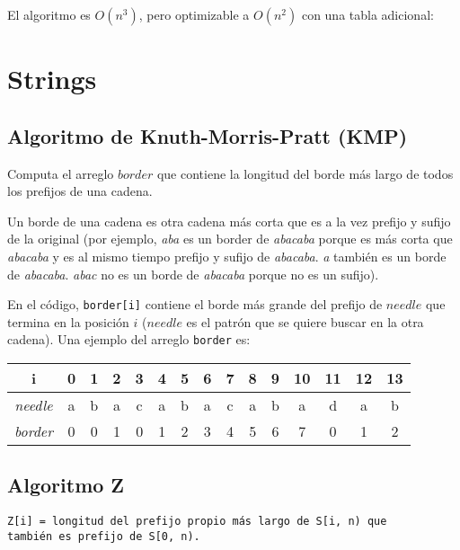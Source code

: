 \documentclass[10pt,letterpaper,twocolumn]{article}
\newcommand{\codigofuente}[1]{

\dotfill
}
\begin{document}
\medskip
El algoritmo es $O(n^3)$, pero optimizable a $O(n^2)$ con una tabla adicional:
\codigofuente{./src/dp/particion_troncos.cpp}

\section{Strings}
\subsection{Algoritmo de Knuth-Morris-Pratt (KMP)}

Computa el arreglo $border$ que contiene la longitud del borde más largo de todos
los prefijos de una cadena.

Un borde de una cadena es otra cadena más corta que es a la vez prefijo y sufijo de la original
(por ejemplo, \textit{aba} es un border de \textit{abacaba} porque es más corta que \textit{abacaba}
y es al mismo tiempo prefijo y sufijo de \textit{abacaba}. \textit{a} también es un borde de \textit{abacaba}.
\textit{abac} no es un borde de \textit{abacaba} porque no es un sufijo).

\smallskip

En el código, \verb_border[i]_ contiene el borde más grande del prefijo de $needle$ que termina en la posición $i$ ($needle$
es el patrón que se quiere buscar en la otra cadena). Una ejemplo del arreglo \verb_border_ es:

\begin{center}
  \begin{tabular}{| c | c c c c c c c c c c c c c c | }
    \hline
    i & 0 & 1 & 2 & 3 & 4 & 5 & 6 & 7 & 8 & 9 & 10 & 11 & 12 & 13 \\ [0.5ex]
    \hline
    \hline
    \textit{needle} & a & b & a & c & a & b & a & c & a & b & a & d & a & b \\
    \textit{border} & 0 & 0 & 1 & 0 & 1 & 2 & 3 & 4 & 5 & 6 & 7 & 0 & 1 & 2 \\
    \hline
  \end{tabular}
\end{center}



\codigofuente{./src/strings/kmp.cpp}

\subsection{Algoritmo Z}

\texttt{Z[i] = longitud del prefijo propio más largo de S[i, n) que \\
también es prefijo de S[0, n).}
\end{document}
